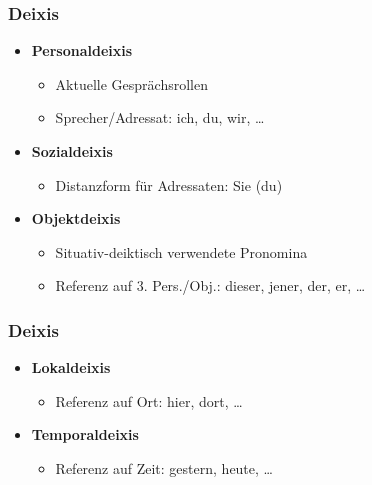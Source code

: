 
\begin{frame}
\frametitle{Deixis}

\begin{itemize}
	\item \textbf{Personaldeixis} 
	
	\begin{itemize}
		\item Aktuelle Gesprächsrollen
		\item Sprecher/Adressat: ich, du, wir, \dots
	\end{itemize}
	
	\item \textbf{Sozialdeixis}
	
	\begin{itemize}
		\item Distanzform für Adressaten: Sie (\vs du)
	\end{itemize}
	
	\item \textbf{Objektdeixis}
	
	\begin{itemize}
		\item Situativ-deiktisch verwendete Pronomina
		\item Referenz auf 3. Pers./Obj.: dieser, jener, der, er, \dots
	\end{itemize}
	
\end{itemize}

\end{frame}


\begin{frame}
\frametitle{Deixis}

\begin{itemize}
	\item \textbf{Lokaldeixis}
	
	\begin{itemize}
		\item Referenz auf Ort: hier, dort, \dots
	\end{itemize}
	
	\item \textbf{Temporaldeixis}
	
	\begin{itemize}
		\item Referenz auf Zeit: gestern, heute, \dots
	\end{itemize}
	
\end{itemize}

\end{frame}


